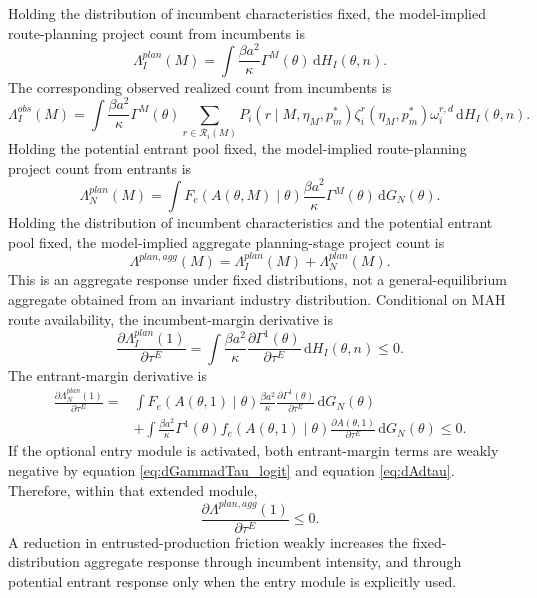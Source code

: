 \documentclass[12pt]{article}
\newcommand{\1}{\mathbf{1}}
\newcommand{\dd}{\mathrm{d}}
\newcommand{\calR}{\mathcal{R}}
\begin{document}
Holding the distribution of incumbent characteristics fixed, the model-implied route-planning project count from incumbents is
\begin{equation}
    \Lambda_I^{plan}(M)
    =
    \int
    \frac{\beta a^2}{\kappa}
    \Gamma^M(\theta)
    \,\dd H_I(\theta,n).
    \label{eq:LambdaI}
\end{equation}
The corresponding observed realized count from incumbents is
\begin{equation}
    \Lambda_I^{obs}(M)
    =
    \int
    \frac{\beta a^2}{\kappa}
    \Gamma^M(\theta)
    \sum_{r\in\calR_i(M)}
    P_i(r\mid M,\eta_M,p_m^*)\zeta_i^r(\eta_M,p_m^*)\omega_i^{r,d}
    \,\dd H_I(\theta,n).
    \label{eq:LambdaIobs}
\end{equation}
Holding the potential entrant pool fixed, the model-implied route-planning project count from entrants is
\begin{equation}
    \Lambda_N^{plan}(M)
    =
    \int
    F_e\!\left(A(\theta,M)\mid\theta\right)
    \frac{\beta a^2}{\kappa}
    \Gamma^M(\theta)
    \,\dd G_N(\theta).
    \label{eq:LambdaN}
\end{equation}
Holding the distribution of incumbent characteristics and the potential entrant pool fixed, the model-implied aggregate planning-stage project count is
\begin{equation}
    \Lambda^{plan,agg}(M)=\Lambda_I^{plan}(M)+\Lambda_N^{plan}(M).
    \label{eq:LambdaAgg}
\end{equation}
This is an aggregate response under fixed distributions, not a general-equilibrium aggregate obtained from an invariant industry distribution.
Conditional on MAH route availability, the incumbent-margin derivative is
\begin{equation}
    \frac{\partial \Lambda_I^{plan}(1)}{\partial\tau^E}
    =
    \int
    \frac{\beta a^2}{\kappa}
    \frac{\partial\Gamma^1(\theta)}{\partial\tau^E}
    \,\dd H_I(\theta,n)
    \le0.
    \label{eq:dLambdaI}
\end{equation}
The entrant-margin derivative is
\begin{align}
    \frac{\partial \Lambda_N^{plan}(1)}{\partial\tau^E}
    =&
    \int
    F_e\!\left(A(\theta,1)\mid\theta\right)
    \frac{\beta a^2}{\kappa}
    \frac{\partial\Gamma^1(\theta)}{\partial\tau^E}
    \,\dd G_N(\theta)
    \nonumber\\
    &+
    \int
    \frac{\beta a^2}{\kappa}
    \Gamma^1(\theta)
    f_e\!\left(A(\theta,1)\mid\theta\right)
    \frac{\partial A(\theta,1)}{\partial\tau^E}
    \,\dd G_N(\theta)
    \le0.
    \label{eq:dLambdaN}
\end{align}
If the optional entry module is activated, both entrant-margin terms are weakly negative by equation \eqref{eq:dGammadTau_logit} and equation \eqref{eq:dAdtau}. Therefore, within that extended module,
\begin{equation}
    \frac{\partial \Lambda^{plan,agg}(1)}{\partial\tau^E}\le0.
    \label{eq:dLambdaAgg}
\end{equation}
A reduction in entrusted-production friction weakly increases the fixed-distribution aggregate response through incumbent intensity, and through potential entrant response only when the entry module is explicitly used.
\end{document}

